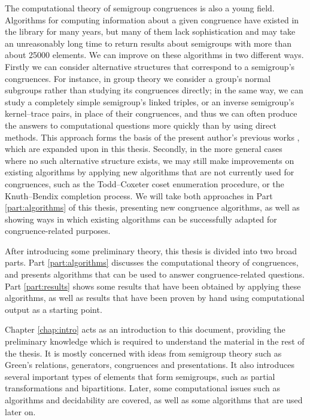 The computational theory of semigroup congruences is also a young field.
Algorithms for computing information about a given congruence have existed in
the \GAP{} library for many years, but many of them lack sophistication and may
take an unreasonably long time to return results about semigroups with more than
about 25000 elements.  We can improve on these algorithms in two different ways.
Firstly we can consider alternative structures that correspond to a semigroup's
congruences.  For instance, in group theory we consider a group's normal
subgroups rather than studying its congruences directly; in the same way, we can
study a completely simple semigroup's linked triples, or an inverse semigroup's
kernel--trace pairs, in place of their congruences, and thus we can often
produce the answers to computational questions more quickly than by using direct
methods.  This approach forms the basis of the present author's previous works
\cite{mtorpey_pre_msc, mtorpey_msc}, which are expanded upon in this
thesis. Secondly, in the more general cases where no such alternative structure
exists, we may still make improvements on existing algorithms by applying new
algorithms that are not currently used for congruences, such as the
Todd--Coxeter coset enumeration procedure, or the Knuth--Bendix completion
process.  We will take both approaches in Part \ref{part:algorithms} of this
thesis, presenting new congruence algorithms, as well as showing ways in which
existing algorithms can be successfully adapted for congruence-related purposes.

After introducing some preliminary theory, this thesis is divided into two broad
parts.  Part \ref{part:algorithms} discusses the computational theory of
congruences, and presents algorithms that can be used to answer
congruence-related questions.  Part \ref{part:results} shows some results that
have been obtained by applying these algorithms, as well as results that have
been proven by hand using computational output as a starting point.

Chapter \ref{chap:intro} acts as an introduction to this document, providing the
preliminary knowledge which is required to understand the material in the rest
of the thesis.  It is mostly concerned with ideas from semigroup theory such as
Green's relations, generators, congruences and presentations.  It also
introduces several important types of elements that form semigroups, such as
partial transformations and bipartitions.  Later, some computational issues such
as algorithms and decidability are covered, as well as some algorithms that are
used later on.

